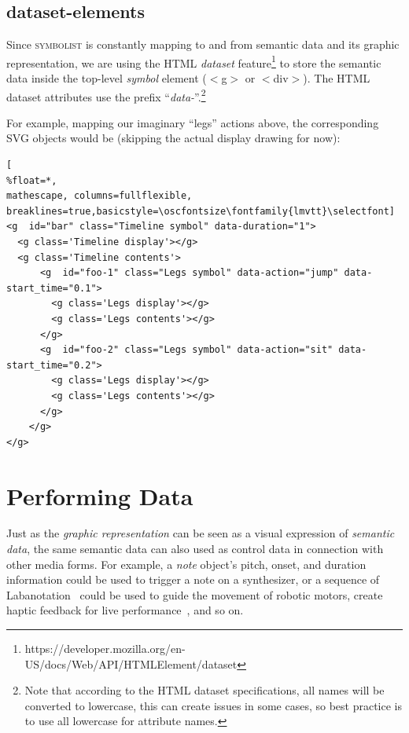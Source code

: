 \documentclass{article}
\def\symbolist{\textsc{symbolist}\xspace}
\def\oscfontsize{\footnotesize}
\begin{document}
\subsection{dataset-elements}

Since \symbolist is constantly mapping to and from semantic data and its graphic representation, we are using the HTML \textit{dataset} feature\footnote{https://developer.mozilla.org/en-US/docs/Web/API/HTMLElement/dataset} to store the semantic data inside the top-level \textit{symbol} element ($<$g$>$ or $<$div$>$).
The HTML dataset attributes use the prefix ``\textit{data-}''.\footnote{Note that according to the HTML dataset specifications, all names will be converted to lowercase, this can create issues in some cases, so best practice is to use all lowercase for attribute names.}

For example, mapping our imaginary ``legs'' actions above, the corresponding SVG objects would be (skipping the actual display drawing for now):

\begin{minipage}{\linewidth}
\begin{lstlisting}[
%float=*,
mathescape, columns=fullflexible, breaklines=true,basicstyle=\oscfontsize\fontfamily{lmvtt}\selectfont]
<g  id="bar" class="Timeline symbol" data-duration="1">
  <g class='Timeline display'></g>
  <g class='Timeline contents'>
      <g  id="foo-1" class="Legs symbol" data-action="jump" data-start_time="0.1">
        <g class='Legs display'></g>
        <g class='Legs contents'></g>
      </g>
      <g  id="foo-2" class="Legs symbol" data-action="sit" data-start_time="0.2">
        <g class='Legs display'></g>
        <g class='Legs contents'></g>
      </g>
    </g>
</g>
\end{lstlisting}
\end{minipage}




\section{Performing Data}

Just as the \textit{graphic representation} can be seen as a visual expression of \textit{semantic data}, the same semantic data can also used as control data in connection with other media forms. For example, a \textit{note} object's pitch, onset, and duration information could be used to trigger a note on a synthesizer, or a sequence of Labanotation~\cite{guest2014labanotation} could be used to guide the movement of robotic motors, create haptic feedback for live performance~\cite{west2019design}, and so on. 
\end{document}
